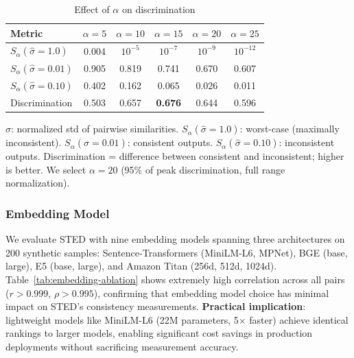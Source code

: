 \documentclass{article}
\theoremstyle{plain}
\theoremstyle{definition}
\begin{document}
\begin{table}[h]
\centering
\caption{Effect of $\alpha$ on discrimination}
\label{tab:alpha-ablation-main}
\scriptsize
\begin{tabular}{@{}lccccc@{}}
\toprule
\textbf{Metric} & $\alpha=5$ & $\alpha=10$ & $\alpha=15$ & $\alpha=20$ & $\alpha=25$ \\
\midrule
$S_\alpha(\hat{\sigma}=1.0)$ & 0.004 & $10^{-5}$ & $10^{-7}$ & $10^{-9}$ & $10^{-12}$ \\
$S_\alpha(\hat{\sigma}=0.01)$ & 0.905 & 0.819 & 0.741 & 0.670 & 0.607 \\
$S_\alpha(\hat{\sigma}=0.10)$ & 0.402 & 0.162 & 0.065 & 0.026 & 0.011 \\
Discrimination & 0.503 & 0.657 & \textbf{0.676} & 0.644 & 0.596 \\
\bottomrule
\end{tabular}

\vspace{0.3em}
\raggedright\scriptsize $\hat{\sigma}$: normalized std of pairwise similarities. $S_\alpha(\hat{\sigma}{=}1.0)$: worst-case (maximally inconsistent). $S_\alpha(\hat{\sigma}{=}0.01)$: consistent outputs. $S_\alpha(\hat{\sigma}{=}0.10)$: inconsistent outputs. Discrimination = difference between consistent and inconsistent; higher is better. We select $\alpha{=}20$ (95\% of peak discrimination, full range normalization).
\end{table}

\subsubsection{Embedding Model}
\label{sec:ablation-embedding}

We evaluate STED with nine embedding models spanning three architectures on 200 synthetic samples: Sentence-Transformers (MiniLM-L6, MPNet), BGE (base, large), E5 (base, large), and Amazon Titan (256d, 512d, 1024d). Table~\ref{tab:embedding-ablation} shows extremely high correlation across all pairs ($r > 0.999$, $\rho > 0.995$), confirming that embedding model choice has minimal impact on STED's consistency measurements. \textbf{Practical implication}: lightweight models like MiniLM-L6 (22M parameters, 5$\times$ faster) achieve identical rankings to larger models, enabling significant cost savings in production deployments without sacrificing measurement accuracy.
\end{document}
